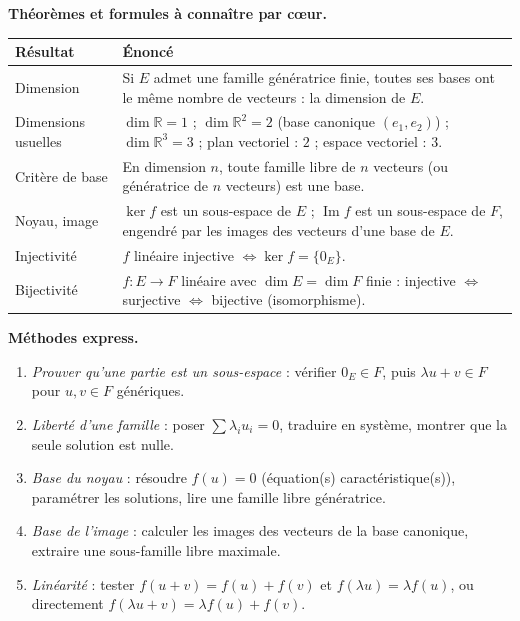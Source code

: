 \documentclass[11pt]{article}
\newcommand{\cle}[1]{{\popxbold\color{popdark}#1}}
\begin{document}
\begin{aretenir}[L'essentiel de la le\c{c}on]
\textbf{Th\'eor\`emes et formules \`a conna\^itre par c\oe ur.}
\begin{center}
\begin{tabularx}{\linewidth}{|l|X|}
\hline
\rowcolor{popblueL} \textbf{R\'esultat} & \textbf{\'Enonc\'e} \\
\hline
Dimension & Si $E$ admet une famille g\'en\'eratrice finie, toutes ses bases ont le m\^eme nombre de vecteurs : la \cle{dimension} de $E$. \\
\hline
Dimensions usuelles & $\dim\mathbb{R}=1$ ; $\dim\mathbb{R}^2=2$ (base canonique $(e_1,e_2)$) ; $\dim\mathbb{R}^3=3$ ; plan vectoriel : $2$ ; espace vectoriel : $3$. \\
\hline
Crit\`ere de base & En dimension $n$, toute famille libre de $n$ vecteurs (ou g\'en\'eratrice de $n$ vecteurs) est une base. \\
\hline
Noyau, image & $\ker f$ est un sous-espace de $E$ ; $\operatorname{Im}f$ est un sous-espace de $F$, engendr\'e par les images des vecteurs d'une base de $E$. \\
\hline
Injectivit\'e & $f$ lin\'eaire injective $\iff \ker f=\{0_E\}$. \\
\hline
Bijectivit\'e & $f:E\to F$ lin\'eaire avec $\dim E=\dim F$ finie : injective $\iff$ surjective $\iff$ bijective (isomorphisme). \\
\hline
\end{tabularx}
\end{center}

\textbf{M\'ethodes express.}
\begin{enumerate}
  \item \emph{Prouver qu'une partie est un sous-espace} : v\'erifier $0_E\in F$, puis $\lambda u+v\in F$ pour $u,v\in F$ g\'en\'eriques.
  \item \emph{Libert\'e d'une famille} : poser $\sum\lambda_i u_i=0$, traduire en syst\`eme, montrer que la seule solution est nulle.
  \item \emph{Base du noyau} : r\'esoudre $f(u)=0$ (\'equation(s) caract\'eristique(s)), param\'etrer les solutions, lire une famille libre g\'en\'eratrice.
  \item \emph{Base de l'image} : calculer les images des vecteurs de la base canonique, extraire une sous-famille libre maximale.
  \item \emph{Lin\'earit\'e} : tester $f(u+v)=f(u)+f(v)$ et $f(\lambda u)=\lambda f(u)$, ou directement $f(\lambda u+v)=\lambda f(u)+f(v)$.
\end{enumerate}
\end{aretenir}
\end{document}
